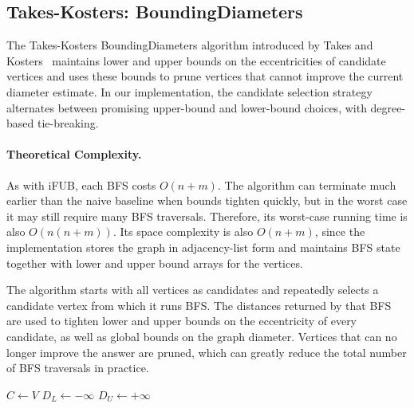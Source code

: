 \documentclass[11pt,a4paper]{article}
\begin{document}
\subsection{Takes-Kosters: BoundingDiameters}

The Takes-Kosters BoundingDiameters algorithm introduced by Takes and
Kosters~\cite{takeskosters} maintains lower and upper bounds on the
eccentricities of candidate vertices and uses these bounds to prune vertices
that cannot improve the current diameter estimate. In our implementation, the
candidate selection strategy alternates between promising upper-bound and
lower-bound choices, with degree-based tie-breaking.

\paragraph{Theoretical Complexity.}
As with iFUB, each BFS costs $O(n+m)$. The algorithm can terminate much earlier
than the naive baseline when bounds tighten quickly, but in the worst case it
may still require many BFS traversals. Therefore, its worst-case running time is
also $O(n(n+m))$.
Its space complexity is also $O(n+m)$, since the implementation stores the
graph in adjacency-list form and maintains BFS state together with lower and
upper bound arrays for the vertices.

The algorithm starts with all vertices as candidates and repeatedly selects a
candidate vertex from which it runs BFS. The distances returned by that BFS are
used to tighten lower and upper bounds on the eccentricity of every candidate,
as well as global bounds on the graph diameter. Vertices that can no longer
improve the answer are pruned, which can greatly reduce the total number of BFS
traversals in practice.

\begin{algorithm}[H]
\caption{Takes-Kosters BoundingDiameters}

$C \leftarrow V$\;
$D_L \leftarrow -\infty$\;
$D_U \leftarrow +\infty$\;
\;
\end{algorithm}
\end{document}
